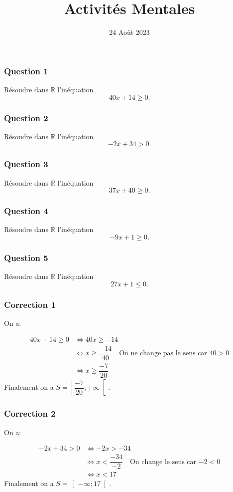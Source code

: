 \documentclass[15pt, mathserif]{beamer}
\title{Activités Mentales}
\date{24 Août 2023}
\begin{document}
\begin{frame}
    \titlepage
\end{frame}

\begin{frame} 
	\frametitle{Question 1}
Résoudre dans $\mathbb{R}$ l'inéquation \[40x+14\geq 0.\]\end{frame}


\begin{frame} 
	\frametitle{Question 2}
Résoudre dans $\mathbb{R}$ l'inéquation \[-2x+34> 0.\]\end{frame}


\begin{frame} 
	\frametitle{Question 3}
Résoudre dans $\mathbb{R}$ l'inéquation \[37x+40\geq 0.\]\end{frame}


\begin{frame} 
	\frametitle{Question 4}
Résoudre dans $\mathbb{R}$ l'inéquation \[-9x+1\geq 0.\]\end{frame}


\begin{frame} 
	\frametitle{Question 5}
Résoudre dans $\mathbb{R}$ l'inéquation \[27x+1\leq 0.\]\end{frame}


\begin{frame}
\vspace{-10mm}
	\frametitle{Correction 1}
On a:

\begin{align*}
	40x+14\geq 0 & \Leftrightarrow 40x\geq-14\\
	 & \Leftrightarrow x\geq\dfrac{-14}{40} \quad \text{On ne change pas le sens car $40>0$}\\
	 & \Leftrightarrow x\geq\dfrac{-7}{20}
\end{align*}Finalement on a $S = \left[\dfrac{-7}{20};+\infty\right[$.\end{frame}


\begin{frame}
\vspace{-10mm}
	\frametitle{Correction 2}
On a:

\begin{align*}
	-2x+34> 0 & \Leftrightarrow -2x>-34\\
	 & \Leftrightarrow x<\dfrac{-34}{-2} \quad \text{On change le sens car $-2<0$}\\
	 & \Leftrightarrow x<17
\end{align*}Finalement on a $S = \left]-\infty;17\right[$.\end{frame}
\end{document}
